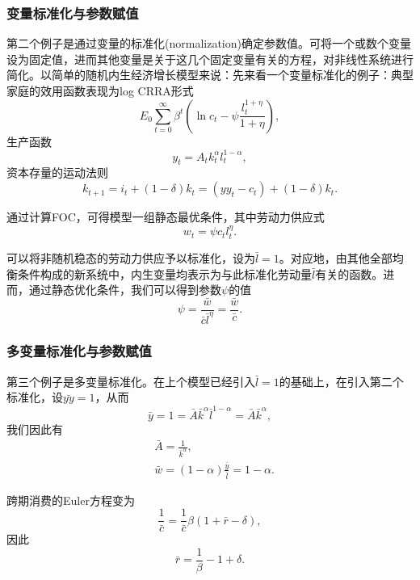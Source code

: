 \subsubsection{变量标准化与参数赋值}
第二个例子是通过变量的标准化(normalization)确定参数值。可将一个或数个变量设为固定值，进而其他变量是关于这几个固定变量有关的方程，对非线性系统进行简化。以简单的随机内生经济增长模型来说：先来看一个变量标准化的例子：典型家庭的效用函数表现为log CRRA形式
\begin{equation*}
  E_0 \sum_{t=0}^{\infty} \beta^t \left( \ln c_t - \psi \frac{l_t^{1+\eta}}{1+\eta} \right),
\end{equation*}
生产函数
\begin{equation*}
  y_t = A_t k_t^{\alpha} l_t^{1-\alpha},
\end{equation*}
资本存量的运动法则
\begin{equation*}
  k_{t+1} = i_t + (1-\delta) k_t = \left(yy_t - c_t \right) + (1-\delta) k_t.
\end{equation*}

通过计算FOC，可得模型一组静态最优条件，其中劳动力供应式
\begin{equation*}
  w_t = \psi c_t l_t^{\eta}.
\end{equation*}

可以将非随机稳态的劳动力供应予以标准化，设为$\bar{l} = 1$。对应地，由其他全部均衡条件构成的新系统中，内生变量均表示为与此标准化劳动量$\bar{l}$有关的函数。进而，通过静态优化条件，我们可以得到参数$\psi$的值
\begin{equation*}
  \psi = \frac{\bar{w}}{\bar{c} \bar{l}^{\eta}} = \frac{\bar{w}}{\bar{c}}.
\end{equation*}

\subsubsection{多变量标准化与参数赋值}
第三个例子是多变量标准化。在上个模型已经引入$\bar{l}=1$的基础上，在引入第二个标准化，设$\bar{yy}=1$，从而
\begin{equation*}
  \bar{y}=1=\bar{A} \bar{k}^{\alpha} \bar{l}^{1-\alpha} = \bar{A} \bar{k}^{\alpha},
\end{equation*}
我们因此有
\begin{align*}
  &\bar{A} = \frac{1}{\bar{k}^{\alpha}}, \\
  &\bar{w} = \left(1-\alpha \right) \frac{\bar{y}}{\bar{l}} = 1-\alpha.
\end{align*}

跨期消费的Euler方程变为
\begin{equation*}
  \frac{1}{\bar{c}} = \frac{1}{\bar{c}} \beta \left( 1 + \bar{r} - \delta \right),
\end{equation*}
因此
\begin{equation*}
  \bar{r} = \frac{1}{\beta} - 1 + \delta.
\end{equation*}


